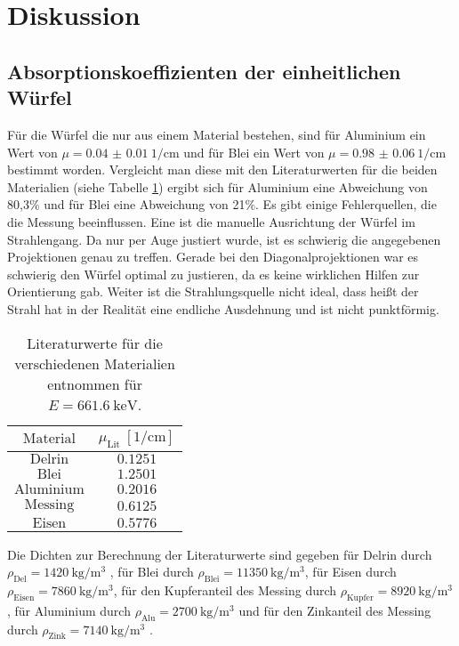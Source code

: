 \newpage
\section{Diskussion}
\label{sec:Diskussion}
\subsection{Absorptionskoeffizienten der einheitlichen Würfel}
Für die Würfel die nur aus einem Material bestehen, sind für Aluminium ein Wert von $\mu=\SI{0.04(1)}{1\per\centi\meter}$ und für Blei ein Wert von $\mu=\SI{0.98(6)}{1\per\centi\meter}$
bestimmt worden. Vergleicht man diese mit den Literaturwerten für die beiden Materialien (siehe Tabelle \ref{tab:tablit}) ergibt sich für Aluminium eine Abweichung von 80,3\% und für
Blei eine Abweichung von 21\%. Es gibt einige Fehlerquellen, die die Messung beeinflussen. Eine ist die manuelle Ausrichtung der Würfel im Strahlengang. Da nur per Auge justiert wurde, ist es schwierig die angegebenen Projektionen genau zu treffen. Gerade bei den Diagonalprojektionen war es schwierig den Würfel optimal zu justieren, da es keine wirklichen Hilfen zur
Orientierung gab. Weiter ist die Strahlungsquelle nicht ideal, dass heißt der Strahl hat in der Realität eine endliche Ausdehnung und ist nicht
punktförmig.\\
\begin{table}
  \centering
  \caption{Literaturwerte für die verschiedenen Materialien \cite{Anleitung3} entnommen für $E=\SI{661,6}{\kilo\electronvolt}$.}
  \label{tab:tablit}
  \begin{tabular}{c c}
    \toprule
		$\mathrm{Material}$ & $\mu_\mathrm{Lit} \: [\si{1\per\centi\meter}]$ \\
    \midrule
    $\mathrm{Delrin}$ & $\num{0,1251}$ \\
		$\mathrm{Blei}$ & $\num{1,2501}$ \\
    $\mathrm{Aluminium}$ & $\num{0,2016}$ \\
    $\mathrm{Messing}$ & $\num{0,6125}$ \\
    $\mathrm{Eisen}$ & $\num{0,5776}$ \\
    \bottomrule
  \end{tabular}
\end{table}
\FloatBarrier
\noindent Die Dichten zur Berechnung der Literaturwerte sind gegeben für Delrin durch $\rho_\mathrm{Del}=\SI{1420}{\kilogram\per\cubic\meter}$ \cite{Anleitung7}, für Blei durch
$\rho_\mathrm{Blei}=\SI{11350}{\kilogram\per\cubic\meter}$, für Eisen durch $\rho_\mathrm{Eisen}=\SI{7860}{\kilogram\per\cubic\meter}$, für den Kupferanteil
des Messing durch $\rho_\mathrm{Kupfer}=\SI{8920}{\kilogram\per\cubic\meter}$ \cite[37]{Anleitung10}, für Aluminium durch $\rho_\mathrm{Alu}=\SI{2700}{\kilogram\per\cubic\meter}$ \cite{Anleitung4} und
für den Zinkanteil des Messing durch $\rho_\mathrm{Zink}=\SI{7140}{\kilogram\per\cubic\meter}$ \cite{Bild2}.
